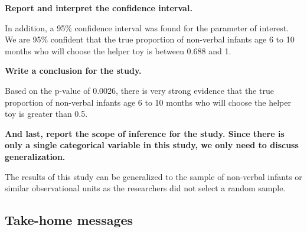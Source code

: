 \documentclass[
]{report}
\begin{document}
\leftskip=0cm

\newpage

\textbf{Report and interpret the confidence interval.}

\leftskip=1cm

In addition, a 95\% confidence interval was found for the parameter of interest. We are 95\% confident that the true proportion of non-verbal infants age 6 to 10 months who will choose the helper toy is between 0.688 and 1.

\leftskip=0cm

\textbf{Write a conclusion for the study.}

\leftskip=1cm

Based on the p-value of 0.0026, there is very strong evidence that the true proportion of non-verbal infants age 6 to 10 months who will choose the helper toy is greater than 0.5.

\leftskip=0cm

\vspace{0.2in}


\textbf{And last, report the scope of inference for the study. Since there is only a single categorical variable in this study, we only need to discuss generalization.}


\leftskip=1cm

The results of this study can be generalized to the sample of non-verbal infants or similar observational units as the researchers did not select a random sample.


\newpage

\subsection{Take-home messages}\label{take-home-messages-5}
\end{document}
